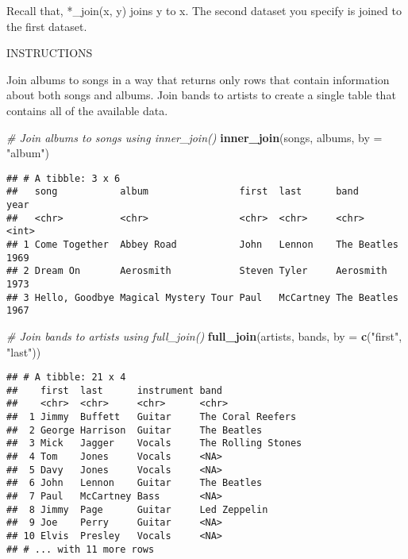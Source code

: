 \documentclass[]{article}
\newenvironment{Shaded}{\begin{snugshade}}{\end{snugshade}}
\newcommand{\KeywordTok}[1]{\textcolor[rgb]{0.13,0.29,0.53}{\textbf{#1}}}
\newcommand{\DataTypeTok}[1]{\textcolor[rgb]{0.13,0.29,0.53}{#1}}
\newcommand{\StringTok}[1]{\textcolor[rgb]{0.31,0.60,0.02}{#1}}
\newcommand{\CommentTok}[1]{\textcolor[rgb]{0.56,0.35,0.01}{\textit{#1}}}
\newcommand{\NormalTok}[1]{#1}
\begin{document}
Recall that, *\_join(x, y) joins y to x. The second dataset you specify
is joined to the first dataset.

INSTRUCTIONS

Join albums to songs in a way that returns only rows that contain
information about both songs and albums. Join bands to artists to create
a single table that contains all of the available data.

\begin{Shaded}
\begin{Highlighting}[]
\CommentTok{# Join albums to songs using inner_join()}
\KeywordTok{inner_join}\NormalTok{(songs, albums, }\DataTypeTok{by =} \StringTok{"album"}\NormalTok{)}
\end{Highlighting}
\end{Shaded}

\begin{verbatim}
## # A tibble: 3 x 6
##   song           album                first  last      band         year
##   <chr>          <chr>                <chr>  <chr>     <chr>       <int>
## 1 Come Together  Abbey Road           John   Lennon    The Beatles  1969
## 2 Dream On       Aerosmith            Steven Tyler     Aerosmith    1973
## 3 Hello, Goodbye Magical Mystery Tour Paul   McCartney The Beatles  1967
\end{verbatim}

\begin{Shaded}
\begin{Highlighting}[]
\CommentTok{# Join bands to artists using full_join()}
\KeywordTok{full_join}\NormalTok{(artists, bands, }\DataTypeTok{by =} \KeywordTok{c}\NormalTok{(}\StringTok{"first"}\NormalTok{, }\StringTok{"last"}\NormalTok{))}
\end{Highlighting}
\end{Shaded}

\begin{verbatim}
## # A tibble: 21 x 4
##    first  last      instrument band              
##    <chr>  <chr>     <chr>      <chr>             
##  1 Jimmy  Buffett   Guitar     The Coral Reefers 
##  2 George Harrison  Guitar     The Beatles       
##  3 Mick   Jagger    Vocals     The Rolling Stones
##  4 Tom    Jones     Vocals     <NA>              
##  5 Davy   Jones     Vocals     <NA>              
##  6 John   Lennon    Guitar     The Beatles       
##  7 Paul   McCartney Bass       <NA>              
##  8 Jimmy  Page      Guitar     Led Zeppelin      
##  9 Joe    Perry     Guitar     <NA>              
## 10 Elvis  Presley   Vocals     <NA>              
## # ... with 11 more rows
\end{verbatim}
\end{document}
